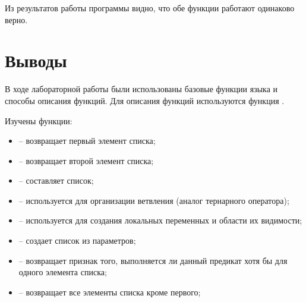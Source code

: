 \documentclass[a4paper,14pt]{extarticle}
\begin{document}
Из результатов работы программы видно, что обе функции работают одинаково верно.

\section*{Выводы}
В ходе лабораторной работы были использованы базовые функции языка  и 
способы описания функций. Для описания функций используются функция .

Изучены функции:
\begin{itemize}
    \item {} -- возвращает первый элемент списка;
    \item {} -- возвращает второй элемент списка;
    \item {} -- составляет список;
    \item {} -- используется для организации ветвления (аналог тернарного оператора);
    \item {} -- используется для создания локальных переменных и области их видимости;
    \item {} -- создает список из параметров;
    \item {} -- возвращает признак того, выполняется ли данный предикат
          хотя бы для одного элемента списка;
    \item {} -- возвращает все элементы списка кроме первого;
\end{itemize}
\end{document}
